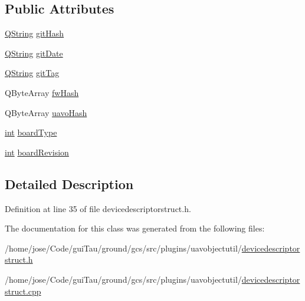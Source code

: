 \subsection*{Public Attributes}
\begin{DoxyCompactItemize}
\item 
\hyperlink{group___u_a_v_objects_plugin_gab9d252f49c333c94a72f97ce3105a32d}{Q\-String} \hyperlink{group___u_a_v_object_util_plugin_ga7c265729bc1bc959e63a3c8f0f1543e8}{git\-Hash}
\item 
\hyperlink{group___u_a_v_objects_plugin_gab9d252f49c333c94a72f97ce3105a32d}{Q\-String} \hyperlink{group___u_a_v_object_util_plugin_gaf7688dd9b2d5fe676da57bbca33e460d}{git\-Date}
\item 
\hyperlink{group___u_a_v_objects_plugin_gab9d252f49c333c94a72f97ce3105a32d}{Q\-String} \hyperlink{group___u_a_v_object_util_plugin_ga69f44ea76d04a61aac18e4393eba4e84}{git\-Tag}
\item 
Q\-Byte\-Array \hyperlink{group___u_a_v_object_util_plugin_ga95764afe0cb2f53538af8c885eed80aa}{fw\-Hash}
\item 
Q\-Byte\-Array \hyperlink{group___u_a_v_object_util_plugin_gaa4639a6c66d44d1f5e0bf6c22c5eec64}{uavo\-Hash}
\item 
\hyperlink{ioapi_8h_a787fa3cf048117ba7123753c1e74fcd6}{int} \hyperlink{group___u_a_v_object_util_plugin_gaca2d8de7c741004f32a16a6d69f6b377}{board\-Type}
\item 
\hyperlink{ioapi_8h_a787fa3cf048117ba7123753c1e74fcd6}{int} \hyperlink{group___u_a_v_object_util_plugin_ga14b177e8d629710371658edd0acc7b3a}{board\-Revision}
\end{DoxyCompactItemize}


\subsection{Detailed Description}


Definition at line 35 of file devicedescriptorstruct.\-h.



The documentation for this class was generated from the following files\-:\begin{DoxyCompactItemize}
\item 
/home/jose/\-Code/gui\-Tau/ground/gcs/src/plugins/uavobjectutil/\hyperlink{devicedescriptorstruct_8h}{devicedescriptorstruct.\-h}\item 
/home/jose/\-Code/gui\-Tau/ground/gcs/src/plugins/uavobjectutil/\hyperlink{devicedescriptorstruct_8cpp}{devicedescriptorstruct.\-cpp}\end{DoxyCompactItemize}
